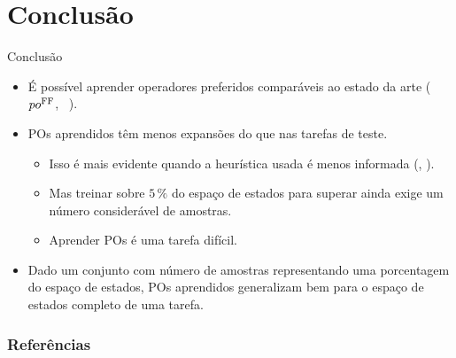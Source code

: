 \documentclass{beamer}
\begin{document}
\section{Conclusão}
\begin{frame}{Conclusão}
\begin{itemize}
  \item É possível aprender operadores preferidos \alert{comparáveis ao estado da arte} ($po^{\text{FF}}$, ~\cite{Hoffmann.Nebel/2001,Helmert/2006,Richter.Helmert/2009}).
  \pause
  \item POs aprendidos \pog têm \alert{menos expansões} do que \poff nas tarefas de teste.
  \pause
    \begin{itemize}
      \item Isso é mais evidente quando a heurística usada é menos informada (\hgc, \hblind).
      \pause
      \item Mas treinar sobre $5\,\%$ do espaço de estados para superar \poff ainda exige um número considerável de amostras.
      \pause
      \item Aprender POs é uma tarefa \alert{difícil}.
    \end{itemize}
  \pause
  \item Dado um conjunto com número de amostras representando uma porcentagem do espaço de estados, POs aprendidos \alert{generalizam bem} para o espaço de estados completo de uma tarefa.
\end{itemize}
\end{frame}

\begin{frame}[allowframebreaks]
\frametitle{Referências}
\printbibliography
\end{frame}
\end{document}
